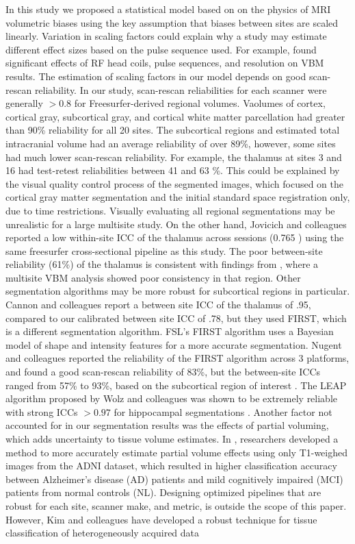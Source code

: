In this study we proposed a statistical model based on on the physics of MRI volumetric biases using the key assumption that biases between sites are scaled linearly. Variation in scaling factors could explain why a study may estimate different effect sizes based on the pulse sequence used. For example, \cite{streitburger2014impact} found significant effects of RF head coils, pulse sequences, and resolution on VBM results. The estimation of scaling factors in our model depends on good scan-rescan reliability. In our study, scan-rescan reliabilities for each scanner were generally $>0.8$ for Freesurfer-derived regional volumes. Vaolumes of cortex, cortical gray, subcortical gray, and cortical white matter parcellation had greater than 90\% reliability for all 20 sites. The subcortical regions and estimated total intracranial volume had an average reliability of over 89\%, however, some sites had much lower scan-rescan reliability. For example, the thalamus at sites 3 and 16 had test-retest reliabilities between 41 and 63 \%. This could be explained by the visual quality control process of the segmented images, which focused on the cortical gray matter segmentation and the initial standard space registration only, due to time restrictions. Visually evaluating all regional segmentations may be unrealistic for a large multisite study. On the other hand, Jovicich and colleagues \cite{jovicich2013brain} reported a low within-site ICC of the thalamus across sessions (0.765 ) using the same freesurfer cross-sectional pipeline as this study. The poor between-site reliability (61\%) of the thalamus is consistent with findings from \cite{schnack2010mapping}, where a multisite VBM analysis showed poor consistency in that region. Other segmentation algorithms may be more robust for subcortical regions in particular.  Cannon and colleagues \cite{cannon2014} report a between site ICC of the thalamus of .95, compared to our calibrated between site ICC of .78, but they used FIRST, which is a different segmentation algorithm. FSL's FIRST algorithm \cite{firstcitation} uses a Bayesian model of shape and intensity features for a more accurate segmentation. Nugent and colleagues reported the reliability of the FIRST algorithm across 3 platforms, and found a good scan-rescan reliability of 83\%, but the between-site ICCs ranged from 57\% to 93\%, based on the subcortical region of interest \cite{firstreliability}. The LEAP algorithm proposed by Wolz and colleagues \cite{Wolz_2010} was shown to be extremely reliable with strong ICCs $>0.97$ for hippocampal segmentations \cite{Wolz_2014}. Another factor not accounted for in our segmentation results was the effects of partial voluming, which adds uncertainty to tissue volume estimates. In \cite{Roche_2014}, researchers developed a method to more accurately estimate partial volume effects using only T1-weighed images from the ADNI dataset, which resulted in higher classification accuracy between Alzheimer's disease (AD) patients and mild cognitively impaired (MCI) patients from normal controls (NL). Designing optimized pipelines that are robust for each site, scanner make, and metric, is outside the scope of this paper. However, Kim and colleagues have developed a robust technique for tissue classification of heterogeneously acquired data 